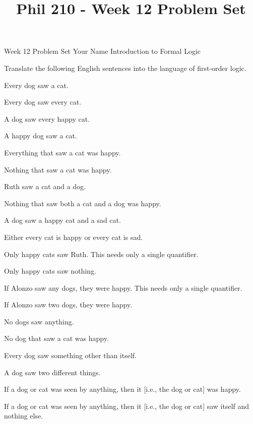 
\title{Phil 210 - Week 12 Problem Set}

\heading
Week 12 Problem Set
Your Name
Introduction to Formal Logic
\endheading

Translate the following English sentences into the language of first-order logic.

\quantifiers
\problems
{}
Every dog saw a cat.
	\answer
	$ $
	\endanswer

Every dog saw every cat.
	\answer
	$ $
	\endanswer

A dog saw every happy cat.
	\answer
	$ $
	\endanswer

A happy dog saw a cat.
	\answer
	$ $
	\endanswer

Everything that saw a cat was happy.
	\answer
	$ $
	\endanswer

Nothing that saw a cat was happy.
	\answer
	$ $
	\endanswer

Ruth saw a cat and a dog.
	\answer
	$ $
	\endanswer

Nothing that saw both a cat and a dog was happy.
	\answer
	$ $
	\endanswer

A dog saw a happy cat and a sad cat.
	\answer
	$ $
	\endanswer

Either every cat is happy or every cat is sad.
	\answer
	$ $
	\endanswer

Only happy cats saw Ruth.
\Hint This needs only a single quantifier.
	\answer
	$ $
	\endanswer

Only happy cats saw nothing.
	\answer
	$ $
	\endanswer

If Alonzo saw any dogs, they were happy.
\Hint This needs only a single quantifier.
	\answer
	$ $
	\endanswer

If Alonzo saw two dogs, they were happy.
	\answer
	$ $
	\endanswer

No dogs saw anything.
	\answer
	$ $
	\endanswer

No dog that saw a cat was happy.
	\answer
	$ $
	\endanswer

Every dog saw something other than itself.
	\answer
	$ $
	\endanswer

A dog saw two different things.
	\answer
	$ $
	\endanswer

If a dog or cat was seen by anything, then it [i.e., the dog or cat] was happy.
	\answer
	$ $
	\endanswer

If a dog or cat was seen by anything, then it [i.e., the dog or cat] saw itself and nothing else.
	\answer
	$ $
	\endanswer

\endproblems
\bye
